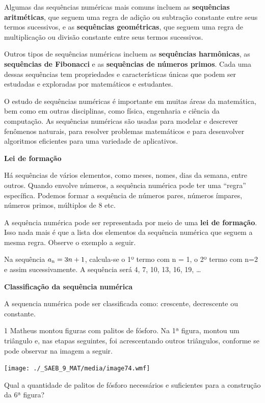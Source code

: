 \begin{escolha}
{{{\begin{escolha}
{Algumas das sequências numéricas mais comuns incluem as \textbf{sequências
aritméticas}, que seguem uma regra de adição ou subtração constante entre
seus termos sucessivos, e as \textbf{sequências geométricas}, que seguem uma
regra de multiplicação ou divisão constante entre seus termos
sucessivos.

Outros tipos de sequências numéricas incluem as \textbf{sequências harmônicas},
as \textbf{sequências de Fibonacci} e as \textbf{sequências de números 
primos}. Cada uma dessas sequências tem propriedades e características 
únicas que podem ser estudadas e exploradas por matemáticos e estudantes.

O estudo de sequências numéricas é importante em muitas áreas da
matemática, bem como em outras disciplinas, como física, engenharia e
ciência da computação. As sequências numéricas são usadas para modelar e
descrever fenômenos naturais, para resolver problemas matemáticos e para
desenvolver algoritmos eficientes para uma variedade de aplicativos.

\textbf{Lei de formação}

Há sequências de vários elementos, como meses, nomes, dias da
semana, entre outros. Quando envolve números, a sequência numérica pode
ter uma ``regra'' específica. Podemos formar a sequência de números
pares, números ímpares, números primos, múltiplos de 8 etc.

A sequência numérica pode ser representada por meio de uma \textbf{lei de
formação}. Isso nada mais é que a lista dos elementos da sequência
numérica que seguem a mesma regra. Observe o exemplo a seguir.

Na sequência $a\textsubscript{n}= 3n + 1$, calcula-se o 1º termo com n = 1,
o 2º termo com n=2 e assim sucessivamente. A sequência será 4, 7, 10, 13, 16, 19, \ldots{}

\textbf{Classificação da sequência numérica}

A sequencia numérica pode ser classificada como: crescente, decrescente
ou constante.}


\num{1} Matheus montou figuras com palitos de fósforo. Na 1ª figura, montou
um triângulo e, nas etapas seguintes, foi acrescentando outros triângulos,
conforme se pode observar na imagem a seguir.

\texttt{[image: ./\_SAEB\_9\_MAT/media/image74.wmf]}

Qual a quantidade de palitos de fósforo necessários e suficientes para a
construção da 6ª figura?


\end{escolha}}}}
\end{escolha}
